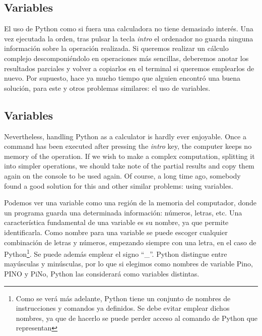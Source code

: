 \begin{paracol}{2}
\subsection{Variables}
El uso de Python como si fuera una calculadora no tiene demasiado interés. Una vez ejecutada la orden, tras pulsar la tecla \emph{intro} el ordenador no guarda ninguna información sobre la operación realizada. Si queremos realizar un cálculo complejo descomponiéndolo en operaciones más sencillas, deberemos anotar los resultados parciales y volver a copiarlos en el terminal si queremos emplearlos de nuevo. Por supuesto, hace ya mucho tiempo que alguien encontró una buena solución, para este y otros problemas similares: el uso de variables.

\switchcolumn
\subsection{Variables}
Nevertheless, handling Python as a calculator is hardly ever enjoyable. Once a command has been executed after pressing the \emph{intro} key, the computer keeps no memory of the operation. If we wish to make a complex computation, splitting it into simpler operations, we should take note of the partial results and copy them again on the console to be used again. Of course, a long time ago, somebody found a good solution for this and other similar problems: using variables.

\switchcolumn
Podemos ver una variable como una región de la memoria del computador, donde un programa guarda una determinada información: números, letras, etc. Una característica fundamental de una variable es su nombre, ya que permite identificarla.  Como nombre para una variable se puede escoger cualquier combinación de letras y números, empezando siempre con una letra, en el caso de Python\footnote{Como se verá más adelante, Python tiene un conjunto de nombres de instrucciones y comandos ya definidos. Se debe evitar emplear dichos nombres, ya que de hacerlo se puede perder acceso al comando de Python que representan}. Se puede además emplear el signo ``\_''. Python distingue entre mayúsculas y minúsculas, por lo que si elegimos como nombres de variable Pino, PINO y PiNo, Python las considerará como variables distintas. 


\end{paracol}
